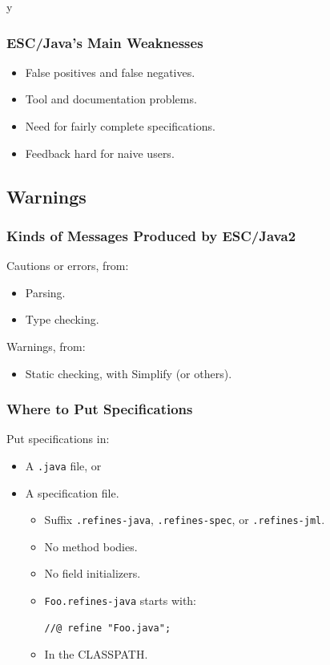 \if y\MAKEHANDOUTS \documentclass[t,compress,landscape,handout]{beamer}
\begin{document}
\begin{frame}
\frametitle{ESC/Java's Main Weaknesses}
\begin{itemize}
\item
False positives and false negatives.

\item
Tool and documentation problems.

\item
Need for fairly complete specifications.

\item
Feedback hard for naive users.
\end{itemize}
\end{frame}

\subsection{Warnings}

\begin{frame}
\frametitle{Kinds of Messages Produced by ESC/Java2}

Cautions or errors, from:
\begin{itemize}
\item
Parsing.

\item
Type checking.
\end{itemize}

Warnings, from:
\begin{itemize}
\item
Static checking, with Simplify (or others).
\end{itemize}
\end{frame}

\begin{frame}[fragile]
\frametitle{Where to Put Specifications}

Put specifications in:
\begin{itemize}
\item
A \texttt{.java} file, or

\item
A \alert{specification file}.
\begin{itemize}
\item
Suffix \texttt{.refines-java}, \texttt{.refines-spec}, or
\texttt{.refines-jml}.

\item
No method bodies.

\item
No field initializers.

\item
\texttt{Foo.refines-java} starts with:
\begin{lstlisting}
//@ refine "Foo.java";
\end{lstlisting}

\item
In the CLASSPATH.
\end{itemize}
\end{itemize}
\end{frame}
\end{document}
